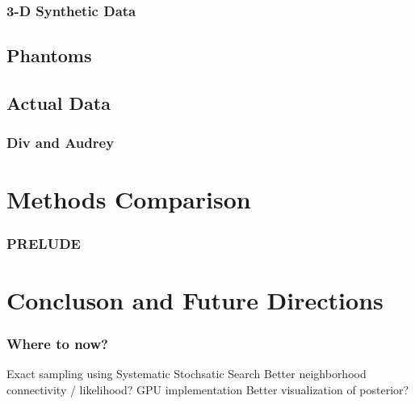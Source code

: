 \documentclass{beamer}
\begin{document}
\begin{frame}
  \frametitle{3-D Synthetic Data}
\end{frame}

\subsection{Phantoms}

\subsection{Actual Data}
\begin{frame}
  \frametitle{Div and Audrey}
\end{frame}

\section{Methods Comparison}
\begin{frame}
  \frametitle{PRELUDE}
\end{frame}

\section{Concluson and Future Directions}
\begin{frame}
  \frametitle{Where to now?}
  Exact sampling using Systematic Stochsatic Search
  Better neighborhood connectivity / likelihood? 
  GPU implementation 
  Better visualization of posterior?
\end{frame}
\end{document}
